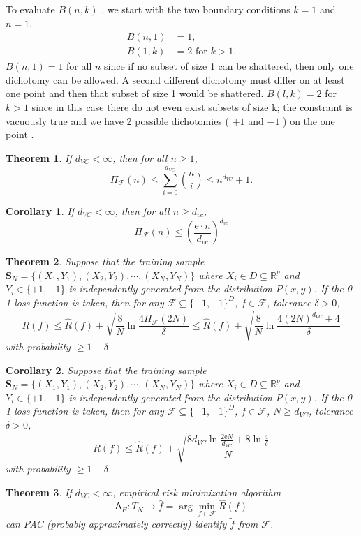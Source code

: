 \documentclass{report}
\newtheorem{corollary}{Corollary}[chapter]
\newtheorem{theorem}{Theorem}[chapter]
\theoremstyle{nonumberplain}
\newcommand{\0}{\mathbf{0}}
\begin{document}
To evaluate $B(n, k)$ , we start with the two boundary conditions
$k = 1$ and $n = 1$.
\[
\begin{aligned} B(n, 1) &=1, \\
 B(1,k) &=2 \text { for } k>1. \end{aligned}
\]
$B(n,1) = 1$ for all $n$ since if no subset of size 1 can be shattered, then only one dichotomy can be allowed. A second different dichotomy must differ on at least one point and then that subset of size 1 would be shattered. $B(l,k) = 2$ for $k > 1$ since in this case there do not even exist subsets of size k; the constraint is vacuously true and we have 2 possible dichotomies ( $+1$ and $-1$ ) on the one point .
\begin{theorem}
	If $d_{VC}<\infty$, then for all $n\ge1$,
	\[
	\Pi_{\mathcal{F}}(n) \le \sum_{i=0}^{d_{VC}}\binom{n}{i}\le n^{d_{VC}}+1.
	\]
\end{theorem}

\begin{corollary}
	If $d_{VC}<\infty$, then for all $n\ge d_{vc}$,
	\[
	\Pi_{\mathcal{F}}(n) \le\left(\frac{\mathrm{e}\cdot n }{d_{vc}}\right)^{d_{vc}}
	\]
\end{corollary}
\begin{theorem}
Suppose that the training sample $\mathbf{S}_N=\{(X_1,Y_1),(X_2,Y_2),\cdots,(X_{N},Y_{N})\}$ where $X_i\in D\subseteq\mathbb{R}^p$ and $Y_i\in\{+1,-1\}$ is  independently generated from the distribution $P(x,y)$. If the 0-1 loss function is taken, then for any $\mathcal{F}\subseteq\{+1,-1\}^D$, $f\in\mathcal{F}$, tolerance $\delta > 0$,
\[
R(f) \le \widehat{R}(f)+\sqrt{\frac{8}{N} \ln \frac{4 \Pi_{\mathcal{F}}(2N)}{\delta}}\le\widehat{R}(f) +\sqrt{\frac{8}{N} \ln \frac{4 (2N)^{d_{VC}}+4}{\delta}}
\]
with probability $\ge 1-\delta$.
\end{theorem}
\begin{corollary}
	Suppose that the training sample $\mathbf{S}_N=\{(X_1,Y_1),(X_2,Y_2),\cdots,(X_{N},Y_{N})\}$ where $X_i\in D\subseteq\mathbb{R}^p$ and $Y_i\in\{+1,-1\}$ is  independently generated from the distribution $P(x,y)$. If the 0-1 loss function is taken, then for any $\mathcal{F}\subseteq\{+1,-1\}^D$, $f\in\mathcal{F}$, $N\ge d_{VC}$, tolerance $\delta > 0$,
	\[
	R(f) \le \widehat{R}(f)+\sqrt{\frac{8 d_{VC} \ln \frac{2 \mathrm{e} N}{d_{VC}}+8 \ln \frac{4}{\delta}}{N}}
	\]
	with probability $\ge 1-\delta$.
\end{corollary}

\begin{theorem}
	If $d_{VC}<\infty$, empirical risk minimization algorithm 
	$$\mathsf{A}_E:T_N\longmapsto \hat{f}=\arg\min_{f\in\mathcal{F}}\widehat{R}(f) $$
	can PAC (probably approximately correctly) identify $\tilde{f}$ from $\mathcal{F}$.
\end{theorem}
\end{document}
